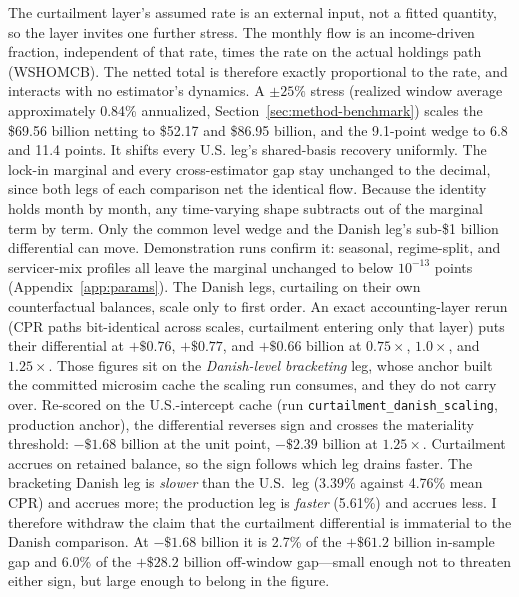 The curtailment layer's assumed rate is an external input, not a fitted quantity, so the layer invites one further stress. The monthly flow is an income-driven fraction, independent of that rate, times the rate on the actual holdings path (WSHOMCB). The netted total is therefore exactly proportional to the rate, and interacts with no estimator's dynamics. A $\pm 25\%$ stress (realized window average approximately 0.84\% annualized, Section~\ref{sec:method-benchmark}) scales the \$69.56 billion netting to \$52.17 and \$86.95 billion, and the 9.1-point wedge to 6.8 and 11.4 points. It shifts every U.S. leg's shared-basis recovery uniformly. The lock-in marginal and every cross-estimator gap stay unchanged to the decimal, since both legs of each comparison net the identical flow. Because the identity holds month by month, any time-varying shape subtracts out of the marginal term by term. Only the common level wedge and the Danish leg's sub-\$1 billion differential can move. Demonstration runs confirm it: seasonal, regime-split, and servicer-mix profiles all leave the marginal unchanged to below $10^{-13}$ points (Appendix~\ref{app:params}). The Danish legs, curtailing on their own counterfactual balances, scale only to first order. An exact accounting-layer rerun (CPR paths bit-identical across scales, curtailment entering only that layer) puts their differential at $+\$0.76$, $+\$0.77$, and $+\$0.66$ billion at $0.75\times$, $1.0\times$, and $1.25\times$. Those figures sit on the \emph{Danish-level bracketing} leg, whose anchor built the committed microsim cache the scaling run consumes, and they do not carry over. Re-scored on the U.S.-intercept cache (run \texttt{curtailment\_danish\_scaling}, production anchor), the differential reverses sign and crosses the materiality threshold: $-\$1.68$ billion at the unit point, $-\$2.39$ billion at $1.25\times$. Curtailment accrues on retained balance, so the sign follows which leg drains faster. The bracketing Danish leg is \emph{slower} than the U.S.\ leg (3.39\% against 4.76\% mean CPR) and accrues more; the production leg is \emph{faster} (5.61\%) and accrues less. I therefore withdraw the claim that the curtailment differential is immaterial to the Danish comparison. At $-\$1.68$ billion it is 2.7\% of the $+\$61.2$ billion in-sample gap and 6.0\% of the $+\$28.2$ billion off-window gap---small enough not to threaten either sign, but large enough to belong in the figure.

